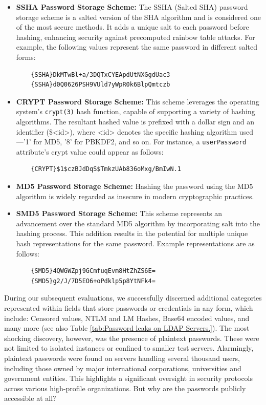 \begin{itemize}
    \item \textbf{SSHA Password Storage Scheme:} The SSHA (Salted SHA) password storage scheme is a salted version of the SHA algorithm and is considered one of the most secure methods. It adds a unique salt to each password before hashing, enhancing security against precomputed rainbow table attacks. For example, the following values represent the same password in different salted forms: 

    \begin{verbatim}
    {SSHA}DkMTwBl+a/3DQTxCYEApdUtNXGgdUac3
    {SSHA}d0Q0626PSH9VUld7yWpR0k6BlpQmtczb
    \end{verbatim}
    
    \item \textbf{CRYPT Password Storage Scheme:} This scheme leverages the operating system's \texttt{crypt(3)} hash function, capable of supporting a variety of hashing algorithms. The resultant hashed value is prefixed with a dollar sign and an identifier (\$<id>), where <id> denotes the specific hashing algorithm used—'1' for MD5, '8' for PBKDF2, and so on. For instance, a \texttt{userPassword} attribute's crypt value could appear as follows:

    \begin{verbatim}
    {CRYPT}$1$czBJdDqS$TmkzUAb836oMxg/BmIwN.1
    \end{verbatim}

    \item \textbf{MD5 Password Storage Scheme:} Hashing the password using the MD5 algorithm is widely regarded as insecure in modern cryptographic practices.

    \item \textbf{SMD5 Password Storage Scheme:} This scheme represents an advancement over the standard MD5 algorithm by incorporating salt into the hashing process. This addition results in the potential for multiple unique hash representations for the same password. Example representations are as follows:

    \begin{verbatim}
    {SMD5}4QWGWZpj9GCmfuqEvm8HtZhZS6E=
    {SMD5}g2/J/7D5EO6+oPdklp5p8YtNFk4=
    \end{verbatim}
    
\end{itemize}

During our subsequent evaluations, we successfully discerned additional categories represented within fields that store passwords or credentials in any form, which include: Censored values, NTLM and LM Hashes, Base64 encoded values, and many more (see also Table \ref{tab:Password leaks on LDAP Servers.}). The most shocking discovery, however, was the presence of plaintext passwords. These were not limited to isolated instances or confined to smaller test servers. Alarmingly, plaintext passwords were found on servers handling several thousand users, including those owned by major international corporations, universities and government entities. This highlights a significant oversight in security protocols across various high-profile organizations. But why are the passwords publicly accessible at all? 

